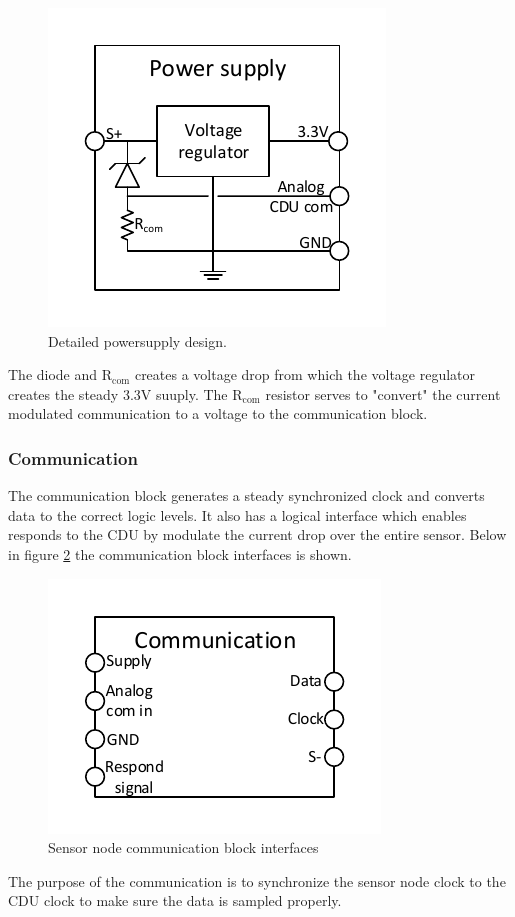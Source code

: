 \begin{figure}[H]
	\centering
	\includegraphics[width=.5\textwidth]{billeder/powersupply_detailed_sn}
	\caption{Detailed powersupply design.}
	\label{fig:SN_detailed_ps}
\end{figure}

The diode and R$_{\text{com}}$ creates a voltage drop from which the voltage regulator creates the steady 3.3V suuply. The R$_{\text{com}}$ resistor serves to "convert" the current modulated communication to a voltage to the communication block.

\subsubsection{Communication}
The communication block generates a steady synchronized clock and converts data to the correct logic levels. It also has a logical interface which enables responds to the CDU by modulate the current drop over the entire sensor. Below in figure \ref{fig:SN_com_fig} the communication block interfaces is shown.

\begin{figure}[H]
	\centering
	\includegraphics[width=.5\textwidth]{billeder/communication_sn}
	\caption{Sensor node communication block interfaces}
	\label{fig:SN_com_fig}
\end{figure}

The purpose of the communication is to synchronize the sensor node clock to the CDU clock to make sure the data is sampled properly.

